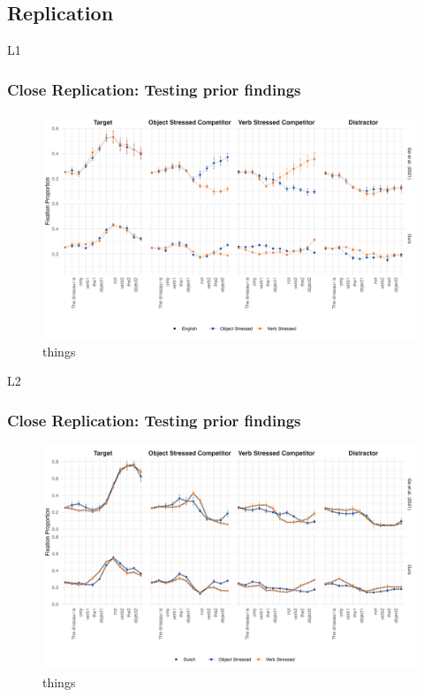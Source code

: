 \subsection{Replication}

L1 

\subsubsection{Close Replication: Testing prior findings}
\begin{figure}[p]  %
    \centering
    \includegraphics[width=\textwidth,height=\textheight,keepaspectratio]{viz/english_fix.png}
    \caption{things}
    \label{fig:english_fix}
\end{figure}



L2

\subsubsection{Close Replication: Testing prior findings}
\begin{figure}[p]  %
    \centering
    \includegraphics[width=\textwidth,height=\textheight,keepaspectratio]{viz/dutch_fix.png}
    \caption{things}
    \label{fig:dutch_fix}
\end{figure}

